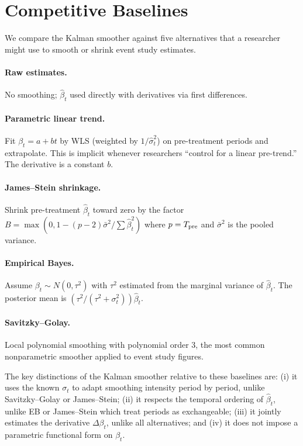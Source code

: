 \documentclass[12pt]{article}
\begin{document}
\section{Competitive Baselines}\label{sec:baselines}

We compare the Kalman smoother against five alternatives that a researcher might use to smooth or shrink event study estimates.

\paragraph{Raw estimates.} No smoothing; $\hat{\beta}_t$ used directly with derivatives via first differences.

\paragraph{Parametric linear trend.} Fit $\beta_t = a + bt$ by WLS (weighted by $1/\hat{\sigma}^2_t$) on pre-treatment periods and extrapolate. This is implicit whenever researchers ``control for a linear pre-trend.'' The derivative is a constant $b$.

\paragraph{James--Stein shrinkage.} Shrink pre-treatment $\hat{\beta}_t$ toward zero by the factor $B = \max(0, 1 - (p-2)\bar{\sigma}^2 / \sum \hat{\beta}_t^2)$ where $p = T_{\rm pre}$ and $\bar{\sigma}^2$ is the pooled variance.

\paragraph{Empirical Bayes.} Assume $\beta_t \sim N(0, \tau^2)$ with $\tau^2$ estimated from the marginal variance of $\hat{\beta}_t$. The posterior mean is $(\tau^2 / (\tau^2 + \sigma^2_t)) \hat{\beta}_t$.

\paragraph{Savitzky--Golay.} Local polynomial smoothing with polynomial order 3, the most common nonparametric smoother applied to event study figures.

\medskip

The key distinctions of the Kalman smoother relative to these baselines are: (i) it uses the known $\sigma_t$ to adapt smoothing intensity period by period, unlike Savitzky--Golay or James--Stein; (ii) it respects the temporal ordering of $\hat{\beta}_t$, unlike EB or James--Stein which treat periods as exchangeable; (iii) it jointly estimates the derivative $\Delta\beta_t$, unlike all alternatives; and (iv) it does not impose a parametric functional form on $\beta_t$.
\end{document}
